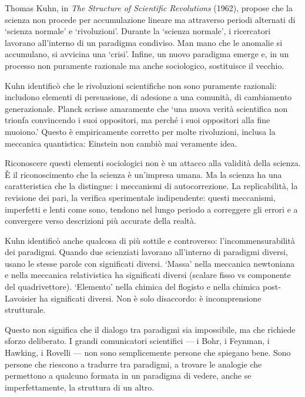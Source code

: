 \documentclass[12pt,a4paper,openany]{book}
\newcommand{\sezione}[1]{\vspace{1.2em}{\large\bfseries #1}\vspace{0.5em}\par}
\begin{document}
Thomas Kuhn, in \textit{The Structure of Scientific Revolutions} (1962), propose che la scienza non procede per accumulazione lineare ma attraverso periodi alternati di `scienza normale' e `rivoluzioni'. Durante la `scienza normale', i ricercatori lavorano all'interno di un paradigma condiviso. Man mano che le anomalie si accumulano, si avvicina una `crisi'. Infine, un nuovo paradigma emerge e, in un processo non puramente razionale ma anche sociologico, sostituisce il vecchio.

Kuhn identificò che le rivoluzioni scientifiche non sono puramente razionali: includono elementi di persuasione, di adesione a una comunità, di cambiamento generazionale. Planck scrisse amaramente che `una nuova verità scientifica non trionfa convincendo i suoi oppositori, ma perché i suoi oppositori alla fine muoiono.' Questo è empiricamente corretto per molte rivoluzioni, inclusa la meccanica quantistica: Einstein non cambiò mai veramente idea.

Riconoscere questi elementi sociologici non è un attacco alla validità della scienza. È il riconoscimento che la scienza è un'impresa umana. Ma la scienza ha una caratteristica che la distingue: i meccanismi di autocorrezione. La replicabilità, la revisione dei pari, la verifica sperimentale indipendente: questi meccanismi, imperfetti e lenti come sono, tendono nel lungo periodo a correggere gli errori e a convergere verso descrizioni più accurate della realtà.

\sezione{Il problema della comunicazione interparadigmatica}

Kuhn identificò anche qualcosa di più sottile e controverso: l'incommensurabilità dei paradigmi. Quando due scienziati lavorano all'interno di paradigmi diversi, usano le stesse parole con significati diversi. `Massa' nella meccanica newtoniana e nella meccanica relativistica ha significati diversi (scalare fisso vs componente del quadrivettore). `Elemento' nella chimica del flogisto e nella chimica post-Lavoisier ha significati diversi. Non è solo disaccordo: è incomprensione strutturale.

Questo non significa che il dialogo tra paradigmi sia impossibile, ma che richiede sforzo deliberato. I grandi comunicatori scientifici --- i Bohr, i Feynman, i Hawking, i Rovelli --- non sono semplicemente persone che spiegano bene. Sono persone che riescono a tradurre tra paradigmi, a trovare le analogie che permettono a qualcuno formata in un paradigma di vedere, anche se imperfettamente, la struttura di un altro.
\end{document}
